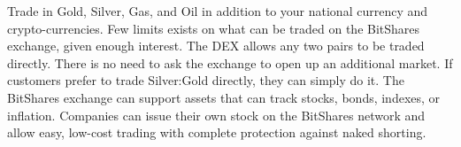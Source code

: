 Trade in Gold, Silver, Gas, and Oil in addition to your national currency and
crypto-currencies. Few limits exists on what can be traded on the BitShares
exchange, given enough interest. The DEX allows any two pairs to be
traded directly. There is no need to ask the exchange to open up an additional
market. If customers prefer to trade Silver:Gold directly, they can simply do
it. The BitShares exchange can support assets that can track stocks, bonds,
indexes, or inflation. Companies can issue their own stock on the BitShares
network and allow easy, low-cost trading with complete protection against naked
shorting.

